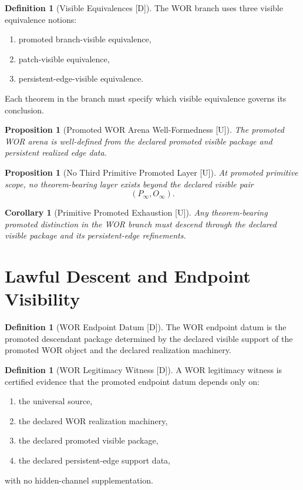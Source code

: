 \documentclass[11pt]{article}
\newtheorem{proposition}[theorem]{Proposition}
\newtheorem{corollary}[theorem]{Corollary}
\theoremstyle{definition}
\newtheorem{definition}[theorem]{Definition}
\theoremstyle{remark}
\newcommand{\U}{\textnormal{[U]}}
\newcommand{\D}{\textnormal{[D]}}
\newcommand{\Pinf}{P_\infty}
\newcommand{\Oinf}{O_\infty}
\begin{document}
\begin{definition}[Visible Equivalences {\D}]
The WOR branch uses three visible equivalence notions:
\begin{enumerate}[label=(\arabic*)]
    \item promoted branch-visible equivalence,
    \item patch-visible equivalence,
    \item persistent-edge-visible equivalence.
\end{enumerate}
Each theorem in the branch must specify which visible equivalence governs its conclusion.
\end{definition}

\begin{proposition}[Promoted WOR Arena Well-Formedness {\U}]
The promoted WOR arena is well-defined from the declared promoted visible package and persistent realized edge data.
\end{proposition}

\begin{proposition}[No Third Primitive Promoted Layer {\U}]
At promoted primitive scope, no theorem-bearing layer exists beyond the declared visible pair
\[
(\Pinf,\Oinf).
\]
\end{proposition}

\begin{corollary}[Primitive Promoted Exhaustion {\U}]
Any theorem-bearing promoted distinction in the WOR branch must descend through the declared visible package and its persistent-edge refinements.
\end{corollary}

\section{Lawful Descent and Endpoint Visibility}

\begin{definition}[WOR Endpoint Datum {\D}]
The WOR endpoint datum is the promoted descendant package determined by the declared visible support of the promoted WOR object and the declared realization machinery.
\end{definition}

\begin{definition}[WOR Legitimacy Witness {\D}]
A WOR legitimacy witness is certified evidence that the promoted endpoint datum depends only on:
\begin{enumerate}[label=(\arabic*)]
    \item the universal source,
    \item the declared WOR realization machinery,
    \item the declared promoted visible package,
    \item the declared persistent-edge support data,
\end{enumerate}
with no hidden-channel supplementation.
\end{definition}
\end{document}
